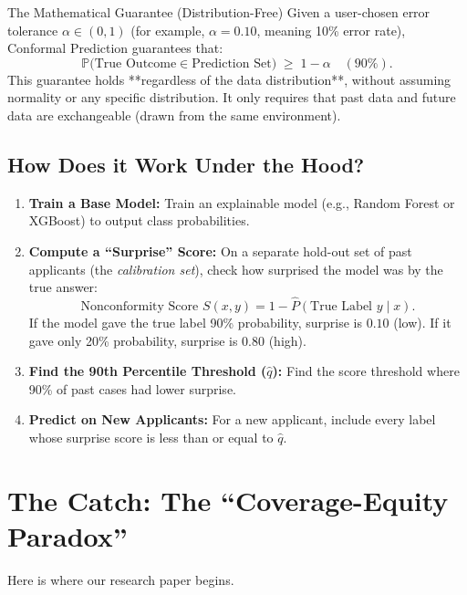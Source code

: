 \documentclass[11pt,a4paper]{article}
\begin{document}
\begin{conceptbox}{The Mathematical Guarantee (Distribution-Free)}
Given a user-chosen error tolerance $\alpha \in (0, 1)$ (for example, $\alpha = 0.10$, meaning 10\% error rate), Conformal Prediction guarantees that:
\[
\mathbb{P}\bigl(\text{True Outcome} \in \text{Prediction Set}\bigr) \;\ge\; 1 - \alpha \quad (90\%).
\]
This guarantee holds **regardless of the data distribution**, without assuming normality or any specific distribution. It only requires that past data and future data are exchangeable (drawn from the same environment).
\end{conceptbox}

\subsection{How Does it Work Under the Hood?}
\begin{enumerate}[leftmargin=1.5em]
    \item \textbf{Train a Base Model:} Train an explainable model (e.g., Random Forest or XGBoost) to output class probabilities.
    \item \textbf{Compute a ``Surprise'' Score:} On a separate hold-out set of past applicants (the \emph{calibration set}), check how surprised the model was by the true answer:
    \[
    \text{Nonconformity Score } S(x, y) = 1 - \hat{P}(\text{True Label } y \mid x).
    \]
    If the model gave the true label 90\% probability, surprise is $0.10$ (low). If it gave only 20\% probability, surprise is $0.80$ (high).
    \item \textbf{Find the 90th Percentile Threshold ($\hat{q}$):} Find the score threshold where 90\% of past cases had lower surprise.
    \item \textbf{Predict on New Applicants:} For a new applicant, include every label whose surprise score is less than or equal to $\hat{q}$.
\end{enumerate}

\section{The Catch: The ``Coverage-Equity Paradox''}

Here is where our research paper begins.
\end{document}
